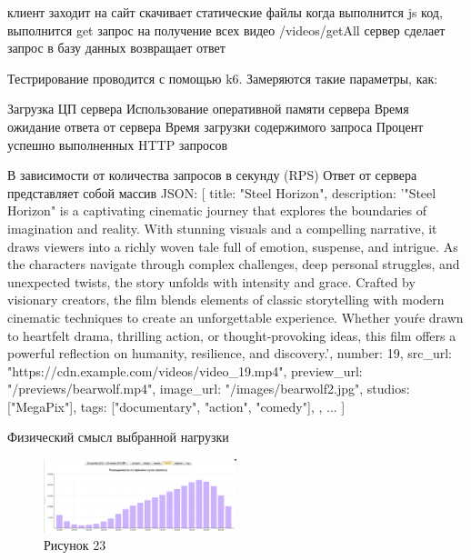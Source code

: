 \documentclass[12pt]{article}
\begin{document}
    клиент заходит на сайт
    скачивает статические файлы
    когда выполнится js код, выполнится get запрос на получение всех видео /videos/getAll
    сервер сделает запрос в базу данных
    возвращает ответ

    Тестрирование проводится с помощью k6. Замеряются такие параметры, как:

    Загрузка ЦП сервера
    Использование оперативной памяти сервера
    Время ожидание ответа от сервера
    Время загрузки содержимого запроса
    Процент успешно выполненных HTTP запросов

    В зависимости от количества запросов в секунду (RPS)
    Ответ от сервера представляет собой массив JSON:
    [
    {
    title: "Steel Horizon",
    description:
    '"Steel Horizon" is a captivating cinematic journey that explores the boundaries of imagination and reality. With stunning visuals and a compelling narrative, it draws viewers into a richly woven tale full of emotion, suspense, and intrigue. As the characters navigate through complex challenges, deep personal struggles, and unexpected twists, the story unfolds with intensity and grace. Crafted by visionary creators, the film blends elements of classic storytelling with modern cinematic techniques to create an unforgettable experience. Whether you\'re drawn to heartfelt drama, thrilling action, or thought-provoking ideas, this film offers a powerful reflection on humanity, resilience, and discovery.',
    number: 19,
    src_url: "https://cdn.example.com/videos/video_19.mp4",
    preview_url: "/previews/bearwolf.mp4",
    image_url: "/images/bearwolf2.jpg",
    studios: ["MegaPix"],
    tags: ["documentary", "action", "comedy"],
    },
    ...
    ]

    Физический смысл выбранной нагрузки
    \begin{figure}[h!]
        \centering
        \includegraphics[width=0.5\textwidth]{../images/pedsovet.png}
        \caption{Рисунок 23}
    \end{figure}
\end{document}
